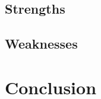 \documentclass{HZNUMCM}
\begin{document}
    \subsection{Strengths}
    \subsection{Weaknesses}

  \section{Conclusion}





  
\end{document}
